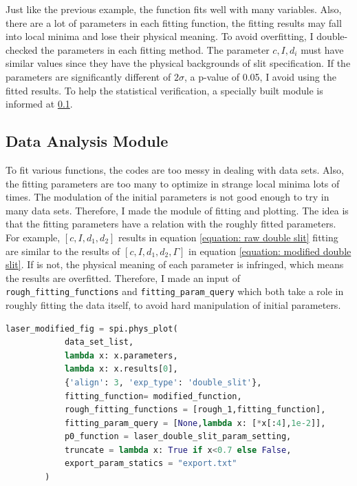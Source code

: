 \documentclass{article}
\begin{document}
 Just like the previous example, the function fits well with many variables.
 Also, there are a lot of parameters in each fitting function, the fitting results may fall into local minima and lose their physical meaning.
 To avoid overfitting, I double-checked the parameters in each fitting method.
 The parameter $c, I,d_i$ must have similar values since they have the physical backgrounds of slit specification.
 If the parameters are significantly different of $2 \sigma$, a p-value of 0.05, I avoid using the fitted results.
 To help the statistical verification, a specially built module is informed at \ref{intro: data analysis}.


 \subsection{Data Analysis Module}
\label{intro: data analysis}
 To fit various functions, the codes are too messy in dealing with data sets.
 Also, the fitting parameters are too many to optimize in strange local minima lots of times.
 The modulation of the initial parameters is not good enough to try in many data sets.
 Therefore, I made the module of fitting and plotting.
 The idea is that the fitting parameters have a relation with the roughly fitted parameters.
 For example, $[c, I,d_1,d_2]$ results in equation \ref{equation: raw double slit} fitting are similar to the results of $[c, I,d_1,d_2,\Gamma]$ in equation \ref{equation: modified double slit}.
 If is not, the physical meaning of each parameter is infringed, which means the results are overfitted.
 Therefore, I made an input of \verb|rough_fitting_functions| and \verb|fitting_param_query| which both take a role in roughly fitting the data itself, to avoid hard manipulation of initial parameters.

 \begin{lstlisting}[language = Python]
    laser_modified_fig = spi.phys_plot(
            data_set_list,
            lambda x: x.parameters,
            lambda x: x.results[0],
            {'align': 3, 'exp_type': 'double_slit'},
            fitting_function= modified_function,
            rough_fitting_functions = [rough_1,fitting_function],
            fitting_param_query = [None,lambda x: [*x[:4],1e-2]],
            p0_function = laser_double_slit_param_setting,
            truncate = lambda x: True if x<0.7 else False,
            export_param_statics = "export.txt"
        )  
 \end{lstlisting}
\end{document}
